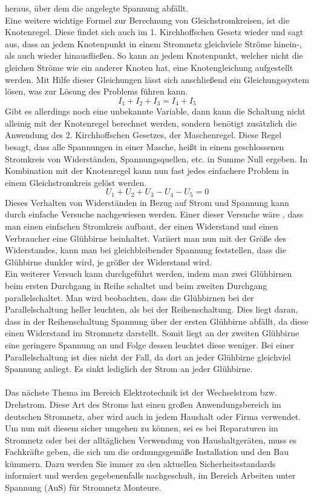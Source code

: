 heraus, über dem die angelegte Spannung abfällt.\\
Eine weitere wichtige Formel zur Berechnung von Gleichstromkreisen, ist die Knotenregel. Diese findet sich auch im 1. Kirchhoffschen Gesetz wieder und sagt 
aus, dass an jedem Knotenpunkt in einem Stromnetz gleichviele Ströme hinein-, als auch wieder hinausfließen. So kann an jedem Knotenpunkt, welcher nicht 
die gleichen Ströme wie ein anderer Knoten hat, eine Knotengleichung aufgestellt werden. Mit Hilfe dieser Gleichungen lässt sich anschließend ein 
Gleichungssystem lösen, was zur Lösung des Problems führen kann.
\begin{equation}
I_1+I_2+I_3=I_4+I_5
\label{eqn:1. Kirchhoffsches Gesetz}
\end{equation}
Gibt es allerdings noch eine unbekannte Variable, dann kann die Schaltung nicht alleinig mit der Knotenregel berechnet werden, sondern benötigt zusätzlich die 
Anwendung des 2. Kirchhoffschen Gesetzes, der Maschenregel. Diese Regel besagt, dass alle Spannungen in einer Masche, heißt in einem geschlossenen Stromkreis 
von Widerständen, Spannungsquellen, etc. in Summe Null ergeben. In Kombination mit der Knotenregel kann nun fast jedes einfachere Problem in einem 
Gleichstromkreis gelöst werden.
\begin{equation}
U_1+U_2+U_3-U_4-U_5=0
\label{eqn:2. Kirchhoffsches Gesetz}
\end{equation}
Dieses Verhalten von Widerständen in Bezug auf Strom und Spannung kann durch einfache Versuche nachgewiesen werden. Einer dieser Versuche wäre \zB, dass 
man einen einfachen Stromkreis aufbaut, der einen Widerstand und einen Verbraucher \zB eine Glühbirne beinhaltet. Variiert man nun mit der Größe des 
Widerstandes, kann man bei gleichbleibender Spannung feststellen, dass die Glühbirne dunkler wird, je größer der Widerstand wird.\\ 
Ein weiterer Versuch kann durchgeführt werden, indem man zwei Glühbirnen beim ersten Durchgang in Reihe schaltet und beim zweiten Durchgang 
parallelschaltet. Man wird beobachten, dass die Glühbirnen bei der Parallelschaltung heller leuchten, als bei der Reihenschaltung. Dies liegt daran, 
dass in der Reihenschaltung Spannung über der ersten Glühbirne abfällt, da diese einen Widerstand im Stromnetz darstellt. Somit liegt an der zweiten 
Glühbirne eine geringere Spannung an und Folge dessen leuchtet diese weniger. Bei einer Parallelschaltung ist dies nicht der Fall, da dort an jeder 
Glühbirne gleichviel Spannung anliegt. Es sinkt lediglich der Strom an jeder Glühbirne. \autocite{Hufschmid.2021}\\\\ 
Das nächste Thema im Bereich Elektrotechnik ist der Wechselstrom bzw. Drehstrom. Diese Art des Stroms hat einen großen Anwendungsbereich im deutschen 
Stromnetz, aber wird auch in jedem Haushalt oder Firma verwendet. Um nun mit diesem sicher umgehen zu können, sei es bei Reparaturen im Stromnetz oder
 bei der alltäglichen Verwendung von Haushaltgeräten, muss es Fachkräfte geben, die sich um die ordnungsgemäße Installation und den Bau kümmern. 
 Dazu werden Sie immer zu den aktuellen Sicherheitsstandards informiert und werden gegebenenfalls nachgeschult, \zB im Bereich Arbeiten unter Spannung (AuS) 
 für Stromnetz Monteure.
